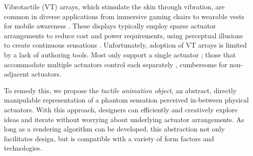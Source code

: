 Vibrotactile (VT) arrays,
which stimulate the skin through vibration, are common in diverse applications from immersive gaming chairs  \cite{Israr2011} to wearable vests for mobile awareness \cite{Jones2004}.
These displays typically employ sparse actuator arrangements to reduce cost and power requirements, using perceptual illusions to create continuous sensations \cite{Alles1970,Israr2011a,Seo2013}.
Unfortunately, adoption of VT arrays is limited by a lack of authoring tools.
Most only support a single actuator \cite{Enriquez2003}; those that accommodate multiple actuators %
control each separately \cite{Kim2009,Paneels2013,Swindells2014},
cumbersome for non-adjacent actuators.

To remedy this, we propose the \textit{tactile animation object}, an abstract, directly manipulable representation of a phantom sensation perceived in-between physical actuators.
With this approach, designers can 
efficiently and creatively explore ideas and iterate without worrying about underlying actuator arrangements.
As long as a rendering algorithm can be developed, this abstraction not only facilitates design, but is compatible with a variety of form factors and technologies.

